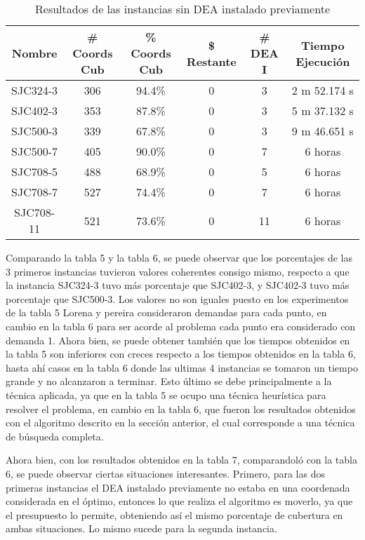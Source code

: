 \documentclass[letter, 10pt]{article}
\begin{document}
\begin{table}[h!]

    \begin{tabular}{|c|c|c|c|c|c|}
    \hline
    Nombre & \# Coords Cub & \% Coords Cub & \$ Restante & \# DEA I & Tiempo Ejecuci\'on\\
    \hline
    SJC324-3 & 306 & 94.4\% & 0 & 3 & 2 m 52.174 s\\
    \hline
    SJC402-3 & 353 & 87.8\% & 0 & 3 & 5 m 37.132 s\\
    \hline
    SJC500-3 & 339 & 67.8\% & 0 & 3 & 9 m 46.651 s\\
    \hline
    SJC500-7 & 405 & 90.0\% & 0 & 7 & 6 horas\\
    \hline
    SJC708-5 & 488 & 68.9\% & 0 & 5 & 6 horas\\
    \hline
    SJC708-7 & 527 & 74.4\% & 0 & 7 & 6 horas\\
    \hline
    SJC708-11 & 521 & 73.6\% & 0 & 11 & 6 horas\\
    \hline
    
    \end{tabular}
    \caption{Resultados de las instancias sin DEA instalado previamente}
    \label{tab:caract}
\end{table}

Comparando la tabla 5 y la tabla 6, se puede observar que los porcentajes de las 3 primeros instancias tuvieron valores coherentes consigo mismo, respecto a que la instancia SJC324-3 tuvo m\'as porcentaje que SJC402-3, y SJC402-3 tuvo m\'as porcentaje que SJC500-3. Los valores no son iguales puesto en los experimentos de la tabla 5 Lorena y pereira consideraron demandas para cada punto, en cambio en la tabla 6 para ser acorde al problema cada punto era considerado con demanda 1. Ahora bien, se puede obtener tambi\'en que los tiempos obtenidos en la tabla 5 son inferiores con creces respecto a los tiempos obtenidos en la tabla 6, hasta ah\'i casos en la tabla 6 donde las ultimas 4 instancias se tomaron un tiempo grande y no alcanzaron a terminar. Esto \'ultimo se debe principalmente a la t\'ecnica aplicada, ya que en la tabla 5 se ocupo una t\'ecnica heur\'istica para resolver el problema, en cambio en la tabla 6, que fueron los resultados obtenidos con el algoritmo descrito en la secci\'on anterior, el cual corresponde a una t\'ecnica de b\'usqueda completa.

Ahora bien, con los resultados obtenidos en la tabla 7, comparandol\'o con la tabla 6, se puede observar ciertas situaciones interesantes. Primero, para las dos primeras instancias el DEA instalado previamente no estaba en una coordenada considerada en el \'optimo, entonces lo que realiza el algoritmo es moverlo, ya que el presupuesto lo permite, obteniendo as\'i el mismo porcentaje de cubertura en ambas situaciones. Lo mismo sucede para la segunda instancia. 
\end{document}
